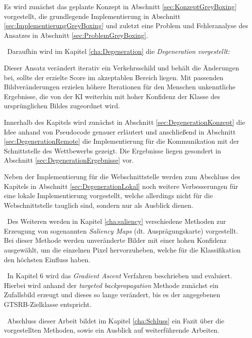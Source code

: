 Es wird zunächst das geplante Konzept in Abschnitt \ref{sec:KonzeptGreyBoxing} vorgestellt, die grundlegende Implementierung in Abschnitt \ref{sec:ImplementierungGreyBoxing} und zuletzt eine Problem und Fehleranalyse des Ansatzes in Abschnitt \ref{sec:ProblemGreyBoxing}.


~\newline Daraufhin wird im Kapitel \ref{cha:Degeneration} die \textit{Degeneration vorgestellt:}

Dieser Ansatz verändert iterativ ein Verkehrsschild und behält die Änderungen bei, sollte der erzielte Score im akzeptablen Bereich liegen. 
Mit passenden Bildveränderungen erzielen höhere Iterationen für den Menschen unkenntliche Ergebnisse, die von der \ac{KI} weiterhin mit hoher Konfidenz der Klasse des ursprünglichen Bildes zugeordnet wird. 

Innerhalb des Kapitels wird zunächst in Abschnitt \ref{sec:DegenerationKonzept} die Idee anhand von Pseudocode genauer erläutert und anschließend in Abschnitt \ref{sec:DegenerationRemote} die Implementierung für die Kommunikation mit der Schnittstelle des Wettbewerbs gezeigt. 
Die Ergebnisse liegen gesondert in Abschnitt \ref{sec:DegenerationErgebnisse} vor. 

Neben der Implementierung für die Webschnittstelle werden zum Abschluss des Kapitels in Abschnitt \ref{sec:DegenerationLokal} noch weitere Verbesserungen für eine lokale Implementierung vorgestellt, welche allerdings nicht für die Webschnittstelle tauglich sind, sondern nur als Ausblick dienen.


~\newline Des Weiteren werden in Kapitel \ref{cha:saliency} verschiedene Methoden zur Erzeugung von sogenannten \textit{Saliency Maps} (dt. Ausprägungskarte) vorgestellt. 
Bei dieser Methode werden unveränderte Bilder mit einer hohen Konfidenz ausgewählt, um die einzelnen Pixel hervorzuheben, welche für die Klassifikation den höchsten Einfluss haben.

~\newline In Kapitel 6 wird das \textit{Gradient Ascent} Verfahren beschrieben und evaluiert. 
Hierbei wird anhand der \textit{targeted backpropagation} Methode zunächst ein Zufallsbild erzeugt und dieses so lange verändert, bis es der angegebenen \ac{GTSRB}-Zielklasse entspricht.

~\newline Abschluss dieser Arbeit bildet im Kapitel \ref{cha:Schluss} ein Fazit über die vorgestellten Methoden, sowie ein Ausblick auf weiterführende Arbeiten. 
